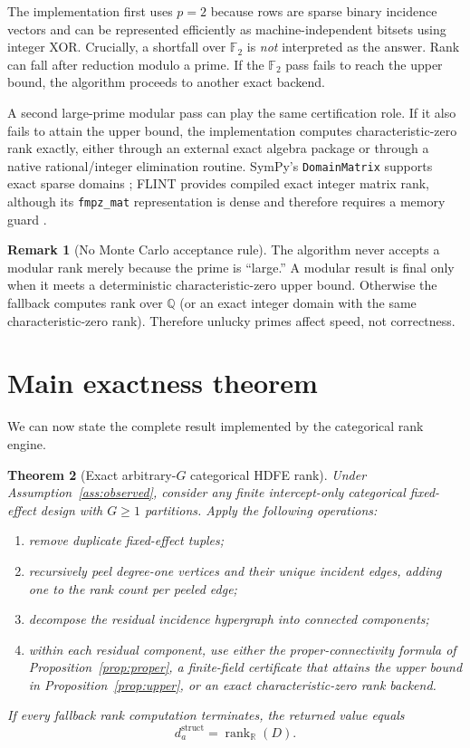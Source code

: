 \documentclass[11pt]{article}
\newtheorem{theorem}{Theorem}[section]
\theoremstyle{definition}
\newtheorem{remark}[theorem]{Remark}
\newcommand{\R}{\mathbb{R}}
\newcommand{\Q}{\mathbb{Q}}
\newcommand{\F}{\mathbb{F}}
\newcommand{\rank}{\operatorname{rank}}
\newcommand{\1}{\mathbf{1}}
\begin{document}
The implementation first uses $p=2$ because rows are sparse binary incidence vectors and can be represented efficiently as machine-independent bitsets using integer XOR. Crucially, a shortfall over $\F_2$ is \emph{not} interpreted as the answer. Rank can fall after reduction modulo a prime. If the $\F_2$ pass fails to reach the upper bound, the algorithm proceeds to another exact backend.

A second large-prime modular pass can play the same certification role. If it also fails to attain the upper bound, the implementation computes characteristic-zero rank exactly, either through an external exact algebra package or through a native rational/integer elimination routine. SymPy's \texttt{DomainMatrix} supports exact sparse domains \citep{SymPyDomainMatrix2026}; FLINT provides compiled exact integer matrix rank, although its \texttt{fmpz\_mat} representation is dense and therefore requires a memory guard \citep{FLINT2026}.

\begin{remark}[No Monte Carlo acceptance rule]
The algorithm never accepts a modular rank merely because the prime is ``large.'' A modular result is final only when it meets a deterministic characteristic-zero upper bound. Otherwise the fallback computes rank over $\Q$ (or an exact integer domain with the same characteristic-zero rank). Therefore unlucky primes affect speed, not correctness.
\end{remark}

\section{Main exactness theorem}

We can now state the complete result implemented by the categorical rank engine.

\begin{theorem}[Exact arbitrary-$G$ categorical HDFE rank]\label{thm:main}
Under Assumption~\ref{ass:observed}, consider any finite intercept-only categorical fixed-effect design with $G\ge1$ partitions. Apply the following operations:
\begin{enumerate}[label=(\roman*)]
  \item remove duplicate fixed-effect tuples;
  \item recursively peel degree-one vertices and their unique incident edges, adding one to the rank count per peeled edge;
  \item decompose the residual incidence hypergraph into connected components;
  \item within each residual component, use either the proper-connectivity formula of Proposition~\ref{prop:proper}, a finite-field certificate that attains the upper bound in Proposition~\ref{prop:upper}, or an exact characteristic-zero rank backend.
\end{enumerate}
If every fallback rank computation terminates, the returned value equals
\begin{equation}
  d_a^{\mathrm{struct}}=\rank_{\R}(D).
\end{equation}
\end{theorem}
\end{document}
